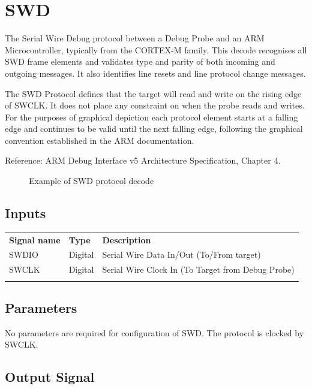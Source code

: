 \section{SWD}

The Serial Wire Debug protocol between a Debug Probe and an ARM Microcontroller, typically from the CORTEX-M family. This
decode recognises all SWD frame elements and validates type and parity of both incoming and outgoing messages. It also
identifies line resets and line protocol change messages.

The SWD Protocol defines that the target will read and write on the rising edge of SWCLK. It does not place any constraint
on when the probe reads and writes. For the purposes of graphical depiction each protocol element starts at a falling edge
and continues to be valid until the next falling edge, following the graphical convention established in the ARM documentation.

Reference: ARM Debug Interface v5 Architecture Specification, Chapter 4.

\begin{figure}[h]
\centering
{}
\caption{Example of SWD protocol decode}
\label{swd_example}
\end{figure}

\subsection{Inputs}

\begin{tabularx}{16cm}{llX}
\thickhline
\textbf{Signal name} & \textbf{Type} & \textbf{Description} \\
\thickhline
SWDIO & Digital & Serial Wire Data In/Out (To/From target)\\
SWCLK & Digital & Serial Wire Clock In (To Target from Debug Probe)\\
\thickhline
\end{tabularx}

\subsection{Parameters}

No parameters are required for configuration of SWD. The protocol is clocked by SWCLK.

\subsection{Output Signal}

